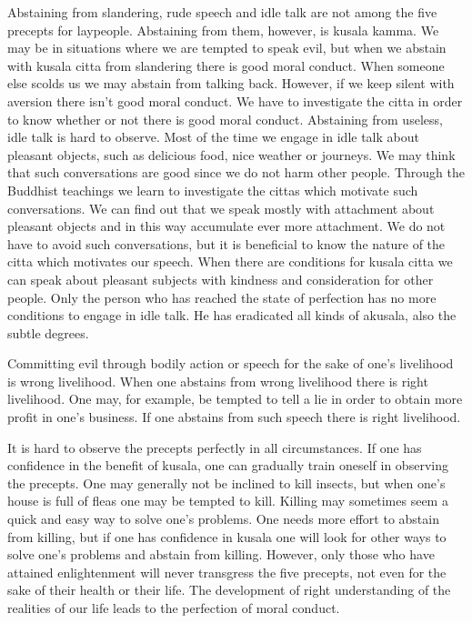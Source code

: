 \documentclass{book}
\begin{document}
Abstaining from slandering, rude speech and idle talk are not among the
five precepts for laypeople. Abstaining from them, however, is kusala
kamma. We may be in situations where we are tempted to speak evil, but
when we abstain with kusala citta from slandering there is good moral
conduct. When someone else scolds us we may abstain from talking back.
However, if we keep silent with aversion there isn't good moral conduct.
We have to investigate the citta in order to know whether or not there    is good moral conduct. Abstaining from useless, idle talk is hard to
observe. Most of the time we engage in idle talk about pleasant objects,
such as delicious food, nice weather or journeys. We may think that such
conver­sations are good since we do not harm other people. Through the
Buddhist teachings we learn to investigate the cittas which motivate
such conversations. We can find out that we speak mostly with attachment
about pleasant objects and in this way accumulate ever more attachment.
We do not have to avoid such conversations, but it is beneficial to know
the nature of the citta which motivates our speech. When there are
conditions for kusala citta we can speak about pleasant subjects with
kindness and consideration for other people. Only the person who has
reached the state of perfection has no more conditions to engage in idle
talk. He has eradicated all kinds of akusala, also the subtle degrees.

Committing evil through bodily action or speech for the sake of one's
livelihood is wrong livelihood. When one abstains from wrong livelihood
there is right livelihood. One may, for example, be tempted to tell a
lie in order to obtain more profit in one's business. If one abstains
from such speech there is right livelihood.

It is hard to observe the precepts perfectly in all circum­stances. If
one has confidence in the benefit of kusala, one can gradually train
oneself in observing the precepts. One may generally not be inclined to
kill insects, but when one's house is full of fleas one may be tempted
to kill. Killing may sometimes seem a quick and easy way to solve one's
problems. One needs more effort to abstain from killing, but if one has
confidence in kusala one will look for other ways to solve one's
problems and abstain from killing. However, only those who have attained
enlighten­ment will never transgress the five precepts, not even for the
sake of their health or their life. The development of right
understanding of the realities of our life leads to the perfection of
moral conduct.
\end{document}
